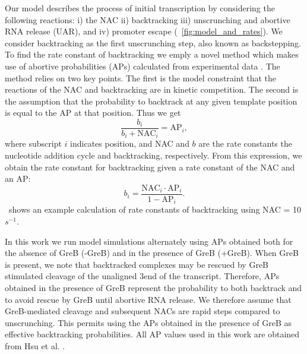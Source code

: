 %
Our model describes the process of initial transcription by considering the
following reactions: i) the NAC ii) backtracking iii) unscrunching and abortive
RNA release (UAR), and iv) promoter escape (\FIG~\ref{fig:model_and_rates}).
We consider backtracking as the first unscrunching step, also known as
backstepping. To find the rate constant of
backtracking we emply a novel method which makes use of abortive probabilities
(APs) calculated from experimental data \cite{hsu_quantitative_1996}. The
method relies on two key points. The first is the model constraint that the
reactions of the NAC and backtracking are in kinetic competition. The second
is the assumption that the probability to backtrack at any given template
position is equal to the AP at that position. Thus we get
\begin{equation*}
    \frac{b_i}{b_i + \text{NAC}_i} = \text{AP}_i,
\end{equation*}
where subscript $i$ indicates position, and NAC and $b$ are the rate constants
the nucleotide addition cycle and backtracking, respectively. From this
expression, we obtain the rate constant for backtracking given a rate constant
of the NAC and an AP:
\begin{equation}
  b_i = \frac{\text{NAC}_i\cdot\text{AP}_i}{1-\text{AP}_i}.
  \label{eq:backtrackingcalc}
\end{equation}
\FIG~\SONEFIGREF shows an example calculation of rate constants of
backtracking using NAC = 10 $s^{-1}$.

In this work we run model simulations alternately using APs obtained both for
the absence of GreB (-GreB) and in the presence of GreB (+GreB). When GreB is
present, we note that backtracked complexes may be rescued by GreB stimulated
cleavage of the unaligned 3\ppp end of the transcript. Therefore, APs obtained
in the presence of GreB represent the probability to both backtrack and to
avoid rescue by GreB until abortive RNA release. We therefore assume that
GreB-mediated cleavage and subsequent NACs are rapid steps compared to
unscrunching. This permits using the APs obtained in the presence of GreB as
effective backtracking probabilities. All AP values used in this work are
obtained from Hsu et al. \cite{hsu_initial_2006}.

